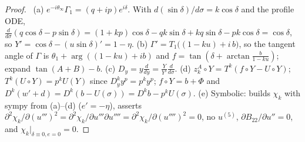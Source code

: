 \begin{proof}\tP\ (a) $e^{-i\theta_\infty}\Gamma_1=(q+ip)e^{i\delta}$. With $d(\sin\delta)/d\sigma=k\cos\delta$ and the profile ODE, $\frac{d}{d\sigma}(q\cos\delta-p\sin\delta)=(1+kp)\cos\delta-qk\sin\delta+kq\sin\delta-pk\cos\delta=\cos\delta$, so $Y'=\cos\delta-(u\sin\delta)'=1-\eta$. (b) $\Gamma'=T_1\bigl((1-ku)+i\,b\bigr)$, so the tangent angle of $\Gamma$ is $\theta_1+\arg((1-ku)+ib)$ and $f=\tan(\delta+\arctan\frac b{1-ku})$; expand $\tan(A+B)-b$. (c) $D_y=y\frac d{dy}=\frac{Y}{Y'}\frac d{d\sigma}$. (d) $z^A_k\circ Y=T^k(f\circ Y-U\circ Y)$; $T^k(U\circ Y)=p^kU(Y)$ since $D_y^ky^p=p^ky^p$; $f\circ Y=b+\Phi$ and $D^k(w'+d)=D^k(b-U(\sigma))=D^kb-p^kU(\sigma)$. (e) Symbolic:  builds $\chi_k$ with sympy from (a)--(d) ($e'=-\eta$), asserts $\partial^2\chi_k/\partial(u''')^2=\partial^2\chi_k/\partial u'''\partial u''''=\partial^2\chi_k/\partial(u'''')^2=0$, no $u^{(5)}$, $\partial B_{22}/\partial u''=0$, and $\chi_k|_{\delta\equiv0,e=0}=0$.
\end{proof}

